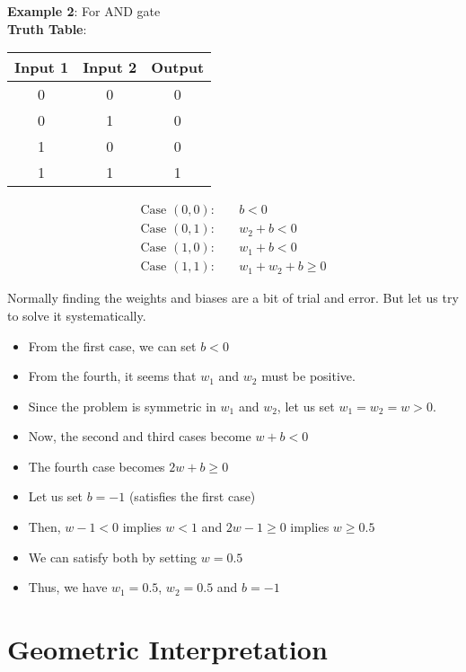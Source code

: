 \textbf{Example 2}: For AND gate \\

\textbf{Truth Table}: \\

\begin{tabular}{|c|c|c|}
\hline
Input 1 & Input 2 & Output \\
\hline
0 & 0 & 0 \\
\hline
0 & 1 & 0 \\
\hline
1 & 0 & 0 \\
\hline
1 & 1 & 1 \\
\hline
\end{tabular}   

\begin{align*}
\text{Case }(0,0): & \quad b < 0 \quad  \\
\text{Case }(0,1): & \quad w_2 + b < 0 \\
\text{Case }(1,0): & \quad w_1 + b < 0 \quad \\
\text{Case }(1,1): & \quad w_1 + w_2 + b \geq 0 
\end{align*}    

Normally finding the weights and biases are a bit of trial and error. But let us try to solve it systematically.
\begin{itemize}
    \item From the first case, we can set $b < 0$ 
    \item From the fourth, it seems that $w_1$ and $w_2$ must be positive.
    \item Since the problem is symmetric in $w_1$ and $w_2$, let us set $w_1 = w_2 = w > 0$.
    \item Now, the second and third cases become $w + b < 0$
    \item The fourth case becomes $2w + b \geq 0$
    \item Let us set $b = -1$ (satisfies the first case)
    \item Then, $w - 1 < 0$ implies $w < 1$ and $2w - 1 \geq 0$ implies $w \geq 0.5$
    \item We can satisfy both by setting $w = 0.5$
    \item Thus, we have $w_1 = 0.5$, $w_2 = 0.5$ and $b = -1$
\end{itemize}



\section{Geometric Interpretation}


